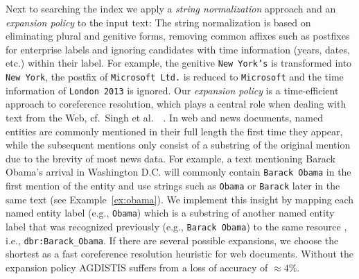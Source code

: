 \documentclass{llncs}
\begin{document}
Next to searching the index we apply a \emph{string normalization} approach and an \emph{expansion policy} to the input text:
The string normalization is based on eliminating plural and genitive forms, removing common affixes such as postfixes for enterprise labels and ignoring candidates with time information (years, dates, etc.) within their label.
For example, the genitive \texttt{New York's} is transformed into \texttt{New York}, the postfix of \texttt{Microsoft Ltd.} is reduced to \texttt{Microsoft} and the time information of \texttt{London 2013} is ignored.
Our \emph{expansion policy} is a time-efficient approach to coreference resolution, which plays a central role when dealing with text from the Web, cf.~Singh et al.~~\cite{Singh}. 
In web and news documents, named entities are commonly mentioned in their full length the first time they appear, while the subsequent mentions only consist of a substring of the original mention due to the brevity of most news data.
For example, a text mentioning Barack Obama's arrival in Washington D.C. will commonly contain \texttt{Barack Obama} in the first mention of the entity and use strings such as \texttt{Obama} or \texttt{Barack} later in the same text (see Example~\ref{ex:obama}).
We implement this insight by mapping each named entity label (e.g., \texttt{Obama}) which is a substring of another named entity label that was recognized previously (e.g., \texttt{Barack Obama}) to the same resource ,\,i.e., \texttt{dbr:Barack\_Obama}.
If there are several possible expansions, we choose the shortest as a fast coreference resolution heuristic for web documents.
Without the expansion policy AGDISTIS suffers from a loss of accuracy of $\approx4\%$.


\end{document}
